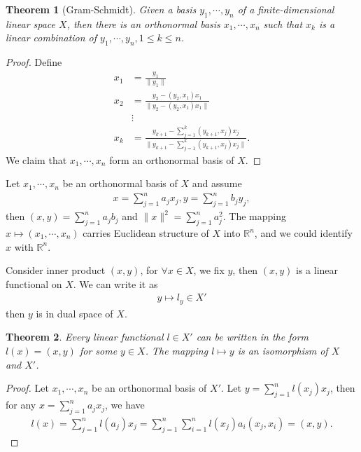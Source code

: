 \documentclass[11pt]{book}
\newtheorem{theorem}{Theorem}[section]
\theoremstyle{definition}
\numberwithin{equation}{subsection}
\begin{document}
\begin{theorem}[Gram-Schmidt]
Given a basis $y_1,\cdots,y_n$ of a finite-dimensional linear space $X$, then there is an orthonormal basis $x_1,\cdots,x_n$ such that $x_k$ is a linear combination of $y_1,\cdots,y_n, 1\leq k \leq n$.
\end{theorem}
\begin{proof}
Define
\begin{align*}
    x_1 & = \frac{y_1}{\|y_1\|} \\
    x_2 & = \frac{y_2 - (y_2,x_1)x_1}{\|y_2 - (y_2,x_1)x_1\|} \\
    & \vdots \\
    x_k & = \frac{y_{k+1} - \sum^k_{j=1}(y_{k+1},x_j)x_j}{\|y_{k+1} - \sum^k_{j=1}(y_{k+1},x_j)x_j\|}.
\end{align*}
We claim that $x_1,\cdots,x_n$ form an orthonormal basis of $X$.
\end{proof}

\medskip

Let $x_1,\cdots,x_n$ be an orthonormal basis of $X$ and assume 
\begin{align*}
    x = \sum^n_{j=1} a_j x_j, y = \sum^n_{j=1} b_j y_j,
\end{align*}
then $(x,y) = \sum^n_{j=1} a_jb_j$ and $\|x\|^2 = \sum^n_{j=1} a_j^2$.  The mapping $x\mapsto (x_1,\cdots,x_n)$ carries Euclidean structure of $X$ into $\mathbb{R}^n$, and we could identify $x$ with $\mathbb{R}^n$.

Consider inner product $(x,y)$, for $\forall x\in X$, we fix $y$, then $(x,y)$ is a linear functional on $X$. We can write it as 
\begin{align*}
    y \mapsto l_y \in X'
\end{align*}
then $y$ is in dual space of $X$.

\medskip

\begin{theorem}
Every linear functional $l\in X'$ can be written in the form $l(x) = (x,y)$ for some $y\in X$. The mapping $l \mapsto y$ is an isomorphism of $X$ and $X'$.
\end{theorem}
\begin{proof}
Let $x_1,\cdots,x_n$ be an orthonormal basis of $X'$. Let $y = \sum^n_{j=1}l(x_j)x_j$, then for any $x = \sum^n_{j=1}a_jx_j$, we have
\begin{align*}
    l(x) = \sum^n_{j=1}l(a_j) x_j = \sum^n_{j=1}\sum^n_{i=1} l(x_j) a_i (x_j, x_i) = (x,y).
\end{align*}
\end{proof}
\end{document}
